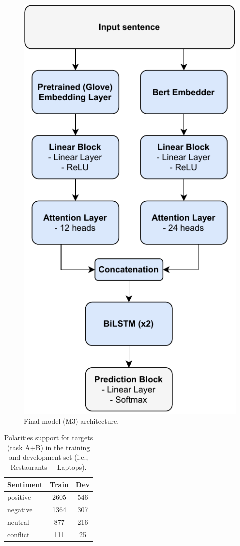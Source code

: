\documentclass[11pt,a4paper]{article}
\begin{document}
	
	\begin{figure}[h]
		\centering
		\includegraphics[width=0.9\columnwidth]{M3_diagram.pdf}
		\caption{Final model (M3) architecture.}
		\label{fig:M3_architecture}
	\end{figure}
	
	\begin{table}[h]
		\centering
		\begin{tabular}{@{}lcc@{}}
			\toprule
			\textbf{Sentiment} & Train & Dev \\ \midrule
			positive           & 2605  & 546 \\
			negative           & 1364  & 307 \\
			neutral            & 877   & 216 \\
			conflict           & 111   & 25  \\ \bottomrule
		\end{tabular}
		\caption{Polarities support for targets (task A+B) in the training and development set (i.e., Restaurants + Laptops).}
		\label{tab:my-table}
	\end{table}
	
\end{document}
